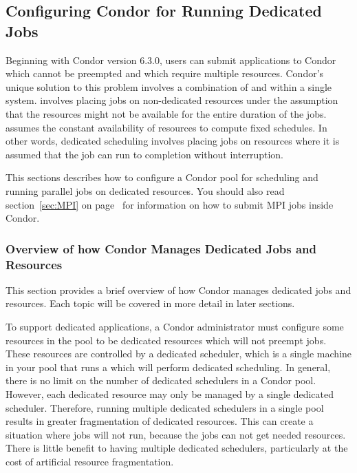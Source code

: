 \subsection{\label{sec:Config-Dedicated-Jobs}
Configuring Condor for Running Dedicated Jobs} 


Beginning with Condor version 6.3.0, users can submit applications to
Condor which cannot be preempted and which require multiple resources.
Condor's unique solution to this problem involves a combination of
 and  within
a single system.
 involves placing jobs on non-dedicated
resources under the assumption that the resources might not be
available for the entire duration of the jobs.
 assumes the constant availability of
resources to compute fixed schedules.
In other words, dedicated scheduling involves placing jobs on
resources where it is assumed that the job can run to completion
without interruption.

This sections describes how to configure a Condor pool for scheduling
and running parallel jobs on dedicated resources.
You should also read section~\ref{sec:MPI} on page~\pageref{sec:MPI}
for information on how to submit MPI jobs inside Condor.


\subsubsection{\label{sec:Overview-Dedicated-Condor}
Overview of how Condor Manages Dedicated Jobs and Resources}

This section provides a brief overview of how Condor manages dedicated
jobs and resources.
Each topic will be covered in more detail in later sections.

To support dedicated applications, a Condor administrator must
configure some resources in the pool to be dedicated resources which
will not preempt jobs.
These resources are controlled by a dedicated scheduler, which is a
single machine in your pool that runs a  which will
perform dedicated scheduling.  
In general, there is no limit on the number of dedicated schedulers in
a Condor pool.
However, each dedicated resource may only be managed by a single
dedicated scheduler.
Therefore, running multiple dedicated schedulers in a single pool
results in greater fragmentation of dedicated resources.
This can create a situation where jobs will not run, because the jobs
can not get needed resources.  
There is little benefit to having multiple dedicated schedulers,
particularly at the cost of artificial resource fragmentation.

